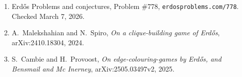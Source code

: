 \begin{enumerate}
\item[\textbf{[EP778]}] Erd\H{o}s Problems and conjectures, Problem \#778, \texttt{erdosproblems.com/778}. Checked March 7, 2026.
\item[\textbf{[MaSp24]}] A.~Malekshahian and N.~Spiro, \emph{On a clique-building game of Erd\H{o}s}, arXiv:2410.18304, 2024.
\item[\textbf{[CaPr25]}] S.~Cambie and H.~Provoost, \emph{On edge-colouring-games by Erd\H{o}s, and Bensmail and Mc Inerney}, arXiv:2505.03497v2, 2025.
\end{enumerate}

